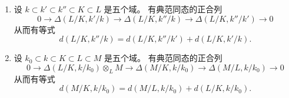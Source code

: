 \begin{proposition}[21.6.4]
\label{0.21.6.4-fr}
\begin{enumerate}
  \item[\rm (i)] 设 $k\subset k'\subset k''\subset K\subset L$ 是五个域。
  有典范同态的正合列
\begin{equation}
\tag{21.6.4.1}
\label{0.21.6.4.1-fr}
0\to\Delta(L/K,k'/k)\to\Delta(L/K,k''/k)\to\Delta(L/K,k''/k')\to0
\end{equation}
从而有等式
\begin{equation}
\tag{21.6.4.2}
\label{0.21.6.4.2-fr}
d(L/K,k''/k)=d(L/K,k''/k')+d(L/K,k'/k).
\end{equation}
  \item[\rm (ii)] 设 $k_0\subset k\subset K\subset L\subset M$ 是五个域。
  有典范同态的正合列
\begin{equation}
\tag{21.6.4.3}
\label{0.21.6.4.3-fr}
0\to\Delta(L/K,k/k_0)\otimes_LM\to\Delta(M/K,k/k_0)
\to\Delta(M/L,k/k_0)\to0
\end{equation}
从而有等式
\begin{equation}
\tag{21.6.4.4}
\label{0.21.6.4.4-fr}
d(M/K,k/k_0)=d(M/L,k/k_0)+d(L/K,k/k_0).
\end{equation}
\end{enumerate}
\end{proposition}

